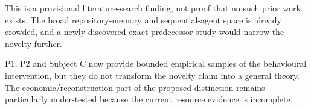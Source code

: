 This is a provisional literature-search finding, not proof that no such prior work exists. The broad repository-memory and sequential-agent space is already crowded, and a newly discovered exact predecessor study would narrow the novelty further.

P1, P2 and Subject C now provide bounded empirical samples of the behavioural intervention, but they do not transform the novelty claim into a general theory. The economic/reconstruction part of the proposed distinction remains particularly under-tested because the current resource evidence is incomplete.
